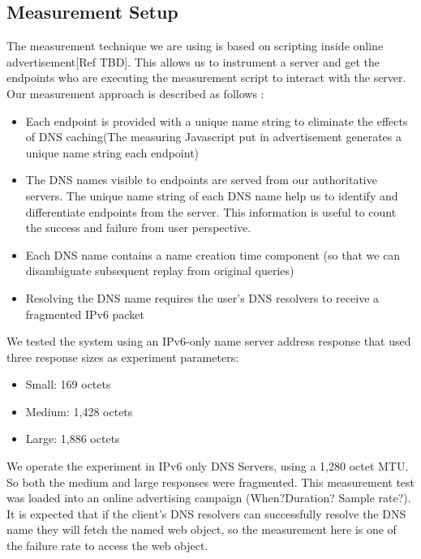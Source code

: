 \subsection{Measurement Setup}


The measurement technique we are using is based on scripting inside
online advertisement[Ref TBD]. This allows us to instrument a server and get the
endpoints who are executing the measurement script to interact with
the server. Our measurement approach is described as follows :


\begin{itemize}
  \item Each endpoint is provided with a unique name string to eliminate the effects of DNS caching(The measuring Javascript put in advertisement generates a unique name string each endpoint)
  \item The DNS names visible to endpoints are served from our authoritative servers. The unique name string of each DNS name help us to identify and differentiate endpoints from the server. This information is useful to count the success and failure from user perspective.
  \item Each DNS name contains a name creation time component (so that we can disambiguate subsequent replay from original queries)
  \item Resolving the DNS name requires the user’s DNS resolvers to receive a fragmented IPv6 packet
\end{itemize}

We tested the system using an IPv6-only name server address
response that used three response sizes as experiment parameters:

\begin{itemize}
  \item Small: 169 octets
  \item Medium: 1,428 octets
  \item Large: 1,886 octets
\end{itemize}

We operate the experiment in IPv6 only DNS Servers, using a 1,280
octet MTU. So both the medium and large responses were fragmented.
This measurement test was loaded into an online advertising campaign
(When?Duration? Sample rate?). It is expected that if the client’s DNS
resolvers can successfully resolve  the   DNS   name they will fetch the
named web object, so the measurement here is one of the failure rate
to access the web object.

